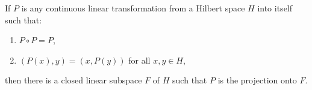 If $P$ is any continuous linear transformation from a Hilbert space $H$ into itself such that:
\begin{enumerate}
\item[(i)] $P \circ P = P$,
\item[(ii)] $(P(x), y) = (x, P(y))$ for all $x, y \in H$,
\end{enumerate}
then there is a closed linear subspace $F$ of $H$ such that $P$ is the projection onto $F$.
